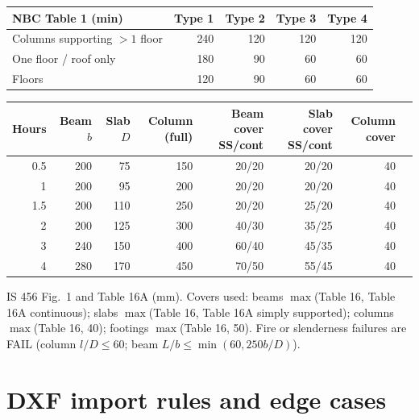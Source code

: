 \documentclass[10pt,a4paper]{article}
\begin{document}
\begin{longtable}{L{30mm}rrrr}
\toprule NBC Table 1 (min) & Type 1 & Type 2 & Type 3 & Type 4 \\ \midrule \endhead
Columns supporting $>1$ floor & 240 & 120 & 120 & 120 \\
One floor / roof only & 180 & 90 & 60 & 60 \\
Floors & 120 & 90 & 60 & 60 \\ \bottomrule
\end{longtable}

\begin{longtable}{rrrrrrrr}
\toprule Hours & Beam $b$ & Slab $D$ & Column (full) & Beam cover SS/cont & Slab cover SS/cont & Column cover \\
\midrule \endhead
0.5 & 200 & 75 & 150 & 20/20 & 20/20 & 40 \\ 1 & 200 & 95 & 200 & 20/20 & 20/20 & 40 \\
1.5 & 200 & 110 & 250 & 20/20 & 25/20 & 40 \\ 2 & 200 & 125 & 300 & 40/30 & 35/25 & 40 \\
3 & 240 & 150 & 400 & 60/40 & 45/35 & 40 \\ 4 & 280 & 170 & 450 & 70/50 & 55/45 & 40 \\ \bottomrule
\end{longtable}
IS 456 Fig.~1 and Table 16A (mm). Covers used: beams $\max$(Table 16, Table 16A continuous); slabs $\max$(Table 16,
Table 16A simply supported); columns $\max$(Table 16, 40); footings $\max$(Table 16, 50). Fire or slenderness
failures are FAIL (column $l/D\le60$; beam $L/b\le\min(60,250b/D)$).

\section{DXF import rules and edge cases}\label{sec:dxf}
\end{document}
